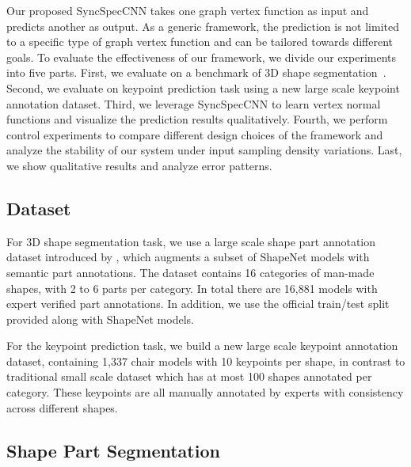 \documentclass[10pt,twocolumn,letterpaper]{article}
\begin{document}
\label{sec:exp}
Our proposed SyncSpecCNN takes one graph vertex function as input and predicts another as output. As a generic framework, the prediction is not limited to a specific type of graph vertex function and can be tailored towards different goals. To evaluate the effectiveness of our framework, we divide our experiments into five parts. First, we evaluate on a benchmark of 3D shape segmentation~\cite{shapenet2015,Yi16}. Second, we evaluate on keypoint prediction task using a new large scale keypoint annotation dataset. Third, we leverage SyncSpecCNN to learn vertex normal functions and visualize the prediction results qualitatively. Fourth, we perform control experiments to compare different design choices of the framework and analyze the stability of our system under input sampling density variations. Last, we show qualitative results and analyze error patterns.

\subsection{Dataset}
For 3D shape segmentation task, we use a large scale shape part annotation dataset introduced by \cite{Yi16}, which augments a subset of ShapeNet models with semantic part annotations. The dataset contains 16 categories of man-made shapes, with 2 to 6 parts per category. In total there are 16,881 models with expert verified part annotations. In addition, we use the official train/test split provided along with ShapeNet models.

For the keypoint prediction task, we build a new large scale keypoint annotation dataset, containing 1,337 chair models with 10 keypoints per shape, in contrast to traditional small scale dataset \cite{kim2013learning} which has at most 100 shapes annotated per category. These keypoints are all manually annotated by experts with consistency across different shapes. 

\subsection{Shape Part Segmentation} 
\end{document}
